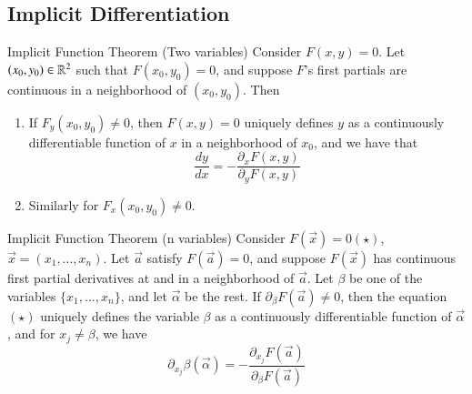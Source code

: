 \documentclass[12pt]{report}
\begin{document}
\begin{appendices}
    \subsection{Implicit Differentiation}

    \begin{thm}{Implicit Function Theorem (Two variables)}{}
        Consider $F(x,y) = 0$. Let $(x_0,y_0) \in \mathbb R^2$ such that $F(x_0,y_0) = 0$, and suppose $F$'s first partials are continuous in a neighborhood of $(x_0,y_0)$. Then \begin{enumerate}
            \item If $F_y(x_0,y_0) \neq 0$, then $F(x,y) = 0$ uniquely defines $y$ as a continuously differentiable function of $x$ in a neighborhood of $x_0$, and we have that \begin{equation}
                    \frac{dy}{dx} = -\frac{\partial_x F(x,y)}{\partial_y F(x,y)}
                \end{equation}
            \item Similarly for $F_x(x_0,y_0) \neq 0$.
        \end{enumerate}
    \end{thm}


    \begin{thm}{Implicit Function Theorem (n variables)}{}
        Consider $F(\vec{x}) = 0 (\star)$, $\vec{x} = (x_1,...,x_n)$. Let $\vec{a}$ satisfy $F(\vec{a}) = 0$, and suppose $F(\vec{x})$ has continuous first partial derivatives at and in a neighborhood of $\vec{a}$. Let $\beta$ be one of the variables $\{x_1,...,x_n\}$, and let $\vec{\alpha}$ be the rest. If $\partial_{\beta}F(\vec{a}) \neq 0$, then the equation $(\star)$ uniquely defines the variable $\beta$ as a continuously differentiable function of $\vec{\alpha}$, and for $x_j \neq \beta$, we have \begin{equation}
            \partial_{x_j}\beta(\vec{\alpha}) = -\frac{\partial_{x_j}F(\vec{a})}{\partial_{\beta}F(\vec{a})}
        \end{equation}
    \end{thm}



\end{appendices}
\end{document}
